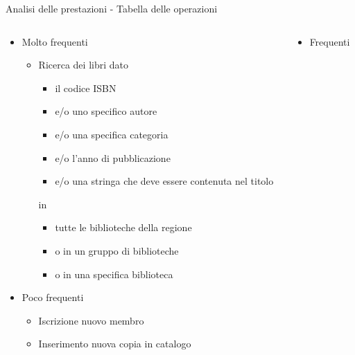 \begin{frame}{Analisi delle prestazioni - Tabella delle operazioni}
    \begin{columns}[c]
        \begin{column}[T]{.45\textwidth}
            \begin{itemize}
                \item Molto frequenti
                    \begin{itemize}
                        \item Ricerca dei libri dato
                            \begin{itemize}
                                \item il codice ISBN
                                \item e/o uno specifico autore
                                \item e/o una specifica categoria
                                \item e/o l'anno di pubblicazione
                                \item e/o una stringa che deve essere contenuta nel titolo
                            \end{itemize}
                            in
                            \begin{itemize}
                                \item tutte le biblioteche della regione
                                \item o in un gruppo di biblioteche
                                \item o in una specifica biblioteca
                            \end{itemize}
                    \end{itemize}
                \item Poco frequenti
                    \begin{itemize}
                        \item Iscrizione nuovo membro
                        \item Inserimento nuova copia in catalogo
                    \end{itemize}
            \end{itemize}
        \end{column}
        \begin{column}[T]{.45\textwidth}
            \begin{itemize}
                \item Frequenti

\end{itemize}
\end{column}
\end{columns}
\end{frame}
